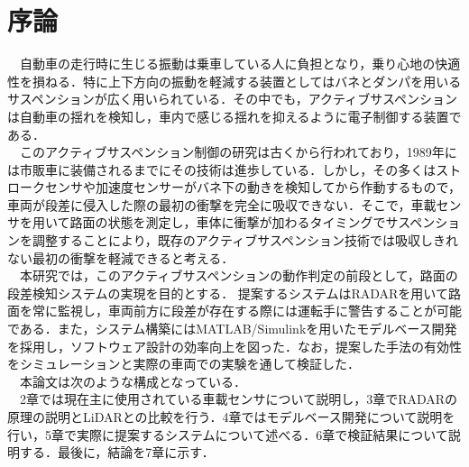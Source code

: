 \chapter{序論}
　自動車の走行時に生じる振動は乗車している人に負担となり，乗り心地の快適性を損ねる．特に上下方向の振動を軽減する装置としてはバネとダンパを用いるサスペンションが広く用いられている．その中でも，アクティブサスペンションは自動車の揺れを検知し，車内で感じる揺れを抑えるように電子制御する装置である．\\
　このアクティブサスペンション制御の研究は古くから行われており，1989年には市販車に装備されるまでにその技術は進歩している\cite{active_suspension}．しかし，その多くはストロークセンサや加速度センサーがバネ下の動きを検知してから作動するもので，車両が段差に侵入した際の最初の衝撃を完全に吸収できない．そこで，車載センサを用いて路面の状態を測定し，車体に衝撃が加わるタイミングでサスペンションを調整することにより，既存のアクティブサスペンション技術では吸収しきれない最初の衝撃を軽減できると考える．\\
　本研究では，このアクティブサスペンションの動作判定の前段として，路面の段差検知システムの実現を目的とする．
提案するシステムはRADARを用いて路面を常に監視し，車両前方に段差が存在する際には運転手に警告することが可能である．また，システム構築にはMATLAB/Simulinkを用いたモデルベース開発を採用し，ソフトウェア設計の効率向上を図った．なお，提案した手法の有効性をシミュレーションと実際の車両での実験を通して検証した．\\
　本論文は次のような構成となっている．\\
　2章では現在主に使用されている車載センサについて説明し，3章でRADARの原理の説明とLiDARとの比較を行う．4章ではモデルベース開発について説明を行い，5章で実際に提案するシステムについて述べる．6章で検証結果について説明する．最後に，結論を7章に示す．\\
